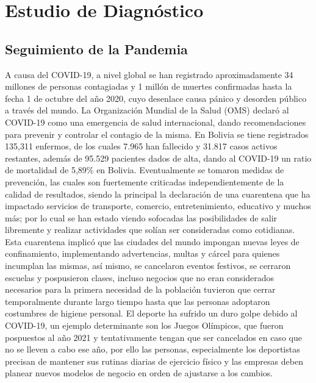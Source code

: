 \chapter{Estudio de Diagnóstico}

\section{Seguimiento de la Pandemia}

A causa del COVID-19, a nivel global se han registrado aproximadamente 34 millones de personas contagiadas y 1 millón de muertes confirmadas hasta la fecha 1 de octubre del año 2020, cuyo desenlace causa pánico y desorden público a través del mundo. La Organización Mundial de la Salud (OMS) declaró al COVID-19 como una emergencia de salud internacional, dando recomendaciones para prevenir y controlar el contagio de la misma. En Bolivia se tiene registrados 135,311 enfermos, de los cuales 7.965 han fallecido y 31.817 casos activos restantes, además de 95.529 pacientes dados de alta, dando al COVID-19 un ratio de mortalidad de 5,89\% en Bolivia. Eventualmente se tomaron medidas de prevención, las cuales son fuertemente criticadas independientemente de la calidad de resultados, siendo la principal la declaración de una cuarentena que ha impactado servicios de transporte, comercio, entretenimiento, educativo y muchos más; por lo cual se han estado viendo sofocadas las posibilidades de salir libremente y realizar actividades que solían ser consideradas como cotidianas.\\

Esta cuarentena implicó que las ciudades del mundo impongan nuevas leyes de confinamiento, implementando advertencias, multas y cárcel para quienes incumplan las mismas, así mismo, se cancelaron eventos festivos, se cerraron escuelas y pospusieron clases, incluso negocios que no eran considerados necesarios para la primera necesidad de la población tuvieron que cerrar temporalmente durante largo tiempo hasta que las personas adoptaron costumbres de higiene personal. El deporte ha sufrido un duro golpe debido al COVID-19, un ejemplo determinante son los Juegos Olímpicos, que fueron pospuestos al año 2021 y tentativamente tengan que ser cancelados en caso que no se lleven a cabo ese año, por ello las personas, especialmente los deportistas precisan de mantener sus rutinas diarias de ejercicio físico y las empresas deben planear nuevos modelos de negocio en orden de ajustarse a los cambios.\\

